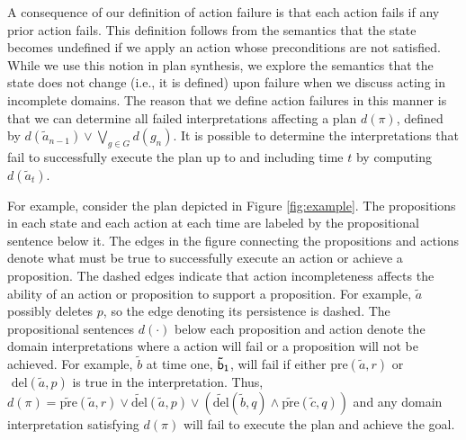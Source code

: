\documentclass[letterpaper]{article}
\begin{document}
A consequence of our definition of action failure is that each action fails if any prior action fails.  This definition follows from the semantics that the state becomes undefined if we apply an action whose preconditions are not satisfied.  While we use this notion in plan synthesis, we explore the semantics that the state does not change (i.e., it is defined) upon failure when we discuss acting in incomplete domains.  The reason that we define action failures in this manner is that we can determine all failed interpretations affecting a plan $d(\pi)$, defined  by  $d(\tilde{a}_{n-1}) \vee \bigvee_{g \in G} d(g_n)$.
%
It is possible to determine the interpretations that fail to successfully execute the plan up to and including time $t$ by computing $d(\tilde{a}_t)$.  

For example, consider the plan depicted in Figure \ref{fig:example}.  The propositions in each state and each action at each time are labeled by the propositional sentence below it. The edges in the figure connecting the propositions and actions denote what must be true to successfully execute an action or achieve a proposition.  The dashed edges indicate that action incompleteness affects the ability of an action or proposition to support a proposition.  For example, $\tilde{a}$ possibly deletes $p$, so the edge denoting its persistence is dashed.  The propositional sentences  $d(\cdot)$  below each proposition and action denote the domain interpretations where a action will fail or a proposition will not be achieved.  For example, $\tilde{b}$ at time one, ${\sf \tilde{b}_1}$, will fail if either $\text{pre}(\tilde{a}, r)$ or $\text{ del}(\tilde{a}, p)$ is true in the interpretation.  Thus, $d(\pi) = \widetilde{\text{pre}}(\tilde{a}, r) \vee \widetilde{\text{del}}(\tilde{a}, p)\vee
  (\widetilde{\text{del}}(\tilde{b}, q) \wedge \widetilde{\text{pre}}(\tilde{c}, q))$ and any domain interpretation satisfying $d(\pi)$ will fail to execute the plan and achieve the goal.
\end{document}
